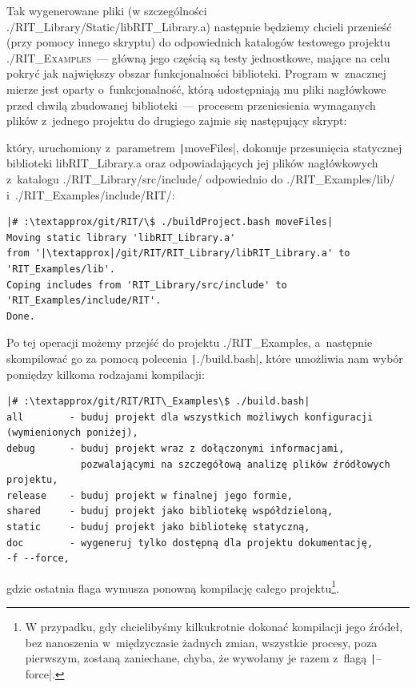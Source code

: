 Tak wygenerowane pliki (w szczególności \textsf{./RIT\_Library/Static/libRIT\_Library.a}) następnie będziemy chcieli przenieść (przy pomocy innego skryptu) do odpowiednich katalogów testowego projektu \textsc{./RIT\_Examples}~--- główną jego częścią są testy jednostkowe, mające na celu pokryć jak największy obszar funkcjonalności biblioteki.
Program w~znacznej mierze jest oparty o~funkcjonalność, którą udostępniają mu pliki nagłówkowe przed chwilą zbudowanej biblioteki~--- procesem przeniesienia wymaganych plików z~jednego projektu do drugiego zajmie się następujący skrypt:
	
który, uruchomiony z~parametrem \texttt|moveFiles|, dokonuje przesunięcia statycznej biblioteki \textsf{libRIT\_Library.a} oraz odpowiadających jej plików nagłówkowych z~katalogu \textsf{./RIT\_Library/src/include/} odpowiednio do \textsf{./RIT\_Examples/lib/} i~\textsf{./RIT\_Examples/include/RIT/}:

\begin{verbatim}
|# :\textapprox/git/RIT/\$ ./buildProject.bash moveFiles|
Moving static library 'libRIT_Library.a' 
from '|\textapprox|/git/RIT/RIT_Library/libRIT_Library.a' to 'RIT_Examples/lib'.
Coping includes from 'RIT_Library/src/include' to 'RIT_Examples/include/RIT'.
Done.
\end{verbatim}

Po tej operacji możemy przejść do projektu \textsf{./RIT\_Examples}, a~następnie skompilować go za pomocą polecenia \texttt|./build.bash|, które umożliwia nam wybór pomiędzy kilkoma rodzajami kompilacji:

\begin{verbatim}
|# :\textapprox/git/RIT/RIT\_Examples\$ ./build.bash|
all        - buduj projekt dla wszystkich możliwych konfiguracji (wymienionych poniżej),
debug      - buduj projekt wraz z dołączonymi informacjami,
             pozwalającymi na szczegółową analizę plików źródłowych projektu,
release    - buduj projekt w finalnej jego formie,
shared     - buduj projekt jako bibliotekę współdzieloną,
static     - buduj projekt jako bibliotekę statyczną,
doc        - wygeneruj tylko dostępną dla projektu dokumentację,
-f --force,
\end{verbatim}
gdzie ostatnia flaga wymusza ponowną kompilację całego projektu\footnote{
	W przypadku, gdy chcielibyśmy kilkukrotnie dokonać kompilacji jego źródeł, bez nanoszenia w~międzyczasie żadnych zmian, wszystkie procesy, poza pierwszym, zostaną zaniechane, chyba, że wywołamy je razem z~flagą \texttt|--force|.
}. 



